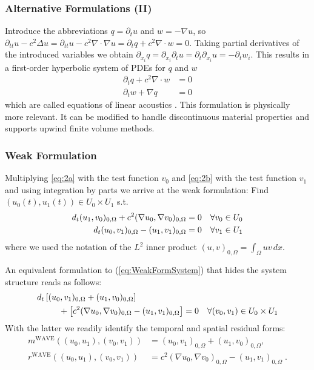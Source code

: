 \documentclass[aspectratio=169,11pt]{beamer}
\theoremstyle{definition}
\begin{document}
\begin{frame}
\frametitle{Alternative Formulations (II)}
Introduce the abbreviations
$q=\partial_t u$ and $w=-\nabla u$, so $\partial_{tt} u - c^2 \Delta u =
\partial_{tt} u - c^2 \nabla\cdot\nabla u = \partial_{t} q + c^2 \nabla\cdot w = 0$.
Taking partial derivatives of the introduced variables we obtain $\partial_{x_i} q=
\partial_{x_i} \partial_t u = \partial_t \partial_{x_i}  u = - \partial_t w_i$. This results
in a first-order hyperbolic system of PDEs for $q$ and $w$
\begin{align*}
\partial_t q + c^2 \nabla\cdot w &= 0\\
\partial_t w + \nabla q &= 0
\end{align*}
which are called equations of linear acoustics \cite{LeVeque}. This formulation
is physically more relevant. It can be modified to handle discontinuous material
properties and supports upwind finite volume methods.
\end{frame}


\begin{frame}
\frametitle{Weak Formulation}

Multiplying \eqref{eq:2a}
with the test function $v_0$ and \eqref{eq:2b} with the test function $v_1$
and using integration by parts we arrive at the weak formulation: Find $(u_0(t),u_1(t))\in
U_0\times U_1$ s.t.
\begin{align}
  d_t (u_1,v_0)_{0,\Omega} + c^2 (\nabla u_0, \nabla v_0)_{0,\Omega} &=
  0 \quad \forall v_0 \in U_0 \notag \\
  d_t (u_0,v_1)_{0,\Omega} - (u_1,v_1)_{0,\Omega} &= 0 \quad \forall
  v_1 \in U_1 \label{eq:WeakFormSystem}
\end{align}
where we used the notation of the $L^2$ inner product $(u,v)_{0,\Omega} = \int_\Omega
u v \, dx$.
\end{frame}

\begin{frame}
An equivalent formulation to (\ref{eq:WeakFormSystem}) that
hides the system structure reads as follows:
\begin{equation}
\label{eq:WeakForm}
\begin{split}
d_t &\left[ (u_0,v_1)_{0,\Omega} + (u_1,v_0)_{0,\Omega}\right] \\
&\hspace{6mm}+ \left[ c^2 (\nabla u_0,\nabla v_0)_{0,\Omega} -(u_1,v_1)_{0,\Omega} \right] = 0
\quad \forall (v_0,v_1)\in U_0\times U_1
\end{split}
\end{equation}
With the latter we readily identify the temporal and spatial residual
forms:
\begin{align}
m^{\text{WAVE}}((u_0,u_1),(v_0,v_1)) &= (u_0,v_1)_{0,\Omega} + (u_1,v_0)_{0,\Omega},
\label{eq:TemporalResForm}\\
r^{\text{WAVE}}((u_0,u_1),(v_0,v_1)) &= c^2 (\nabla u_0,\nabla
v_0)_{0,\Omega} - (u_1,v_1)_{0,\Omega} \; . \label{eq:SpatialResForm}
\end{align}
\end{frame}
\end{document}
